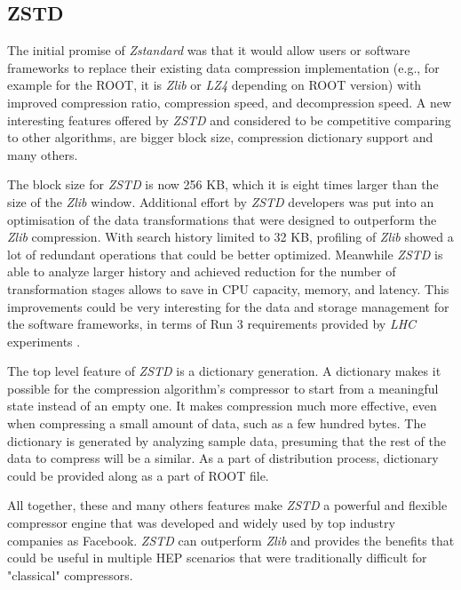 \documentclass[12pt]{iopart}
\begin{document}
\subsection{ZSTD}

The initial promise of \textit{Zstandard} \cite{zstd} \cite{zstd-facebook} was that it would allow users or software frameworks to replace their existing data compression implementation (e.g., for example for the ROOT, it is \textit{Zlib} or \textit{LZ4} depending on ROOT version) with improved compression ratio, compression speed, and decompression speed. A new interesting features offered by \textit{ZSTD} and considered to be competitive comparing to other algorithms, are bigger block size, compression dictionary support and many others.

The block size for \textit{ZSTD} is now 256 KB, which it is eight times larger than the size of the \textit{Zlib} window. Additional effort by \textit{ZSTD} developers was put into an optimisation of the data transformations that were designed to outperform the \textit{Zlib} compression.  With search history limited to 32 KB, profiling of \textit{Zlib} showed a lot of redundant operations that could be better optimized. Meanwhile \textit{ZSTD} is able to analyze larger history and  achieved reduction for the number of transformation stages allows to save in CPU capacity, memory, and latency. This improvements could be very interesting for the data and storage management for the software frameworks, in terms of Run 3 requirements provided by \textit{LHC} experiments \cite{zstd-facebook}. 

The top level feature of \textit{ZSTD} is a dictionary generation. A dictionary makes it possible for the compression algorithm's compressor to start from a meaningful state instead of an empty one. It makes compression much more effective, even when compressing a small amount of data, such as a few hundred bytes. The dictionary is generated by analyzing sample data, presuming that the rest of the data to compress will be a similar. As a part of distribution process, dictionary could be provided along as a part of ROOT file.

All together, these and many others features make \textit{ZSTD} a powerful and flexible compressor engine that was developed and  widely used by top industry companies as Facebook. \textit{ZSTD} can outperform \textit{Zlib} and provides the benefits that could be useful in multiple HEP scenarios that were traditionally difficult for "classical" compressors.
\end{document}
